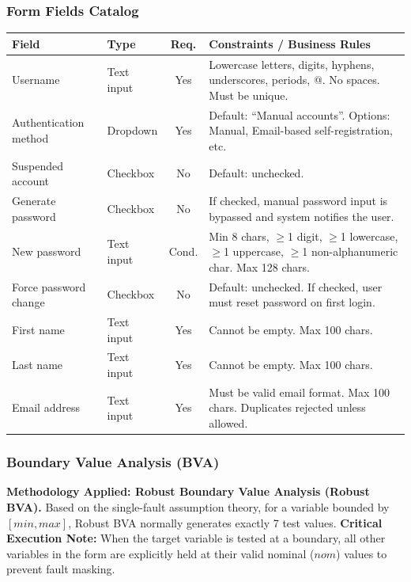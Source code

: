 \documentclass[twoside,final]{hcmut-report}
\begin{document}
\subsubsection{Form Fields Catalog}
\begin{table}[H]
\centering
\renewcommand{\arraystretch}{1.3}
\begin{tabularx}{\textwidth}{|l|l|c|X|}
\hline
\textbf{Field} & \textbf{Type} & \textbf{Req.} & \textbf{Constraints / Business Rules} \\ \hline
Username & Text input & Yes & Lowercase letters, digits, hyphens, underscores, periods, @. No spaces. Must be unique. \\ \hline
Authentication method & Dropdown & Yes & Default: ``Manual accounts''. Options: Manual, Email-based self-registration, etc. \\ \hline
Suspended account & Checkbox & No & Default: unchecked. \\ \hline
Generate password & Checkbox & No & If checked, manual password input is bypassed and system notifies the user. \\ \hline
New password & Text input & Cond. & Min 8 chars, $\geq$1 digit, $\geq$1 lowercase, $\geq$1 uppercase, $\geq$1 non-alphanumeric char. Max 128 chars. \\ \hline
Force password change & Checkbox & No & Default: unchecked. If checked, user must reset password on first login. \\ \hline
First name & Text input & Yes & Cannot be empty. Max 100 chars. \\ \hline
Last name & Text input & Yes & Cannot be empty. Max 100 chars. \\ \hline
Email address & Text input & Yes & Must be valid email format. Max 100 chars. Duplicates rejected unless allowed. \\ \hline
\end{tabularx}
\end{table}

\subsubsection{Boundary Value Analysis (BVA)}
\textbf{Methodology Applied: Robust Boundary Value Analysis (Robust BVA).} 
Based on the single-fault assumption theory, for a variable bounded by $[min, max]$, Robust BVA normally generates exactly 7 test values. \textbf{Critical Execution Note:} When the target variable is tested at a boundary, all other variables in the form are explicitly held at their valid nominal ($nom$) values to prevent fault masking.
\end{document}
